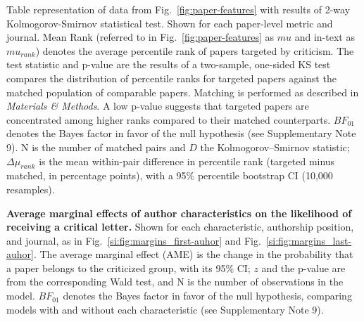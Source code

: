 \documentclass[12pt]{article} %
\def\methods{\textit{Materials \& Methods}}
\begin{document}
\clearpage
\begin{table}[p]
\scriptsize
\centering
\caption{
Table representation of data from Fig.~\ref*{fig:paper-features} with results of 2-way Kolmogorov-Smirnov statistical test. 
Shown for each paper-level metric and journal. 
Mean Rank (referred to in Fig.~\ref*{fig:paper-features} as $mu$ and in-text as $mu_{rank}$) denotes the average percentile rank of papers targeted by criticism.
The test statistic and p-value are the results of a two-sample, one-sided KS test compares the distribution of percentile ranks for targeted papers against the matched population of comparable papers. 
Matching is performed as described in \methods.
A low p-value suggests that targeted papers are concentrated among higher ranks compared to their matched counterparts.
$BF_{01}$ denotes the Bayes factor in favor of the null hypothesis (see Supplementary Note 9).
 N is the number of matched pairs and $D$ the Kolmogorov–Smirnov statistic; $\Delta\mu_{rank}$ is the mean within-pair difference in percentile rank (targeted minus matched, in percentage points), with a 95\% percentile bootstrap CI (10,000 resamples).
}
\label{si:table:paper-features-2sKS} 
%
\end{table}


\begin{table}[ht]
\footnotesize
\centering
\caption{
\textbf{Average marginal effects of author characteristics on the likelihood of receiving a critical letter.}
Shown for each characteristic, authorship position, and journal, as in Fig.~\ref{si:fig:margins_first-auhor} and Fig.~\ref{si:fig:margins_last-auhor}.
The average marginal effect (AME) is the change in the probability that a paper belongs to the criticized group, with its 95\% CI; $z$ and the p-value are from the corresponding Wald test, and N is the number of observations in the model.
$BF_{01}$ denotes the Bayes factor in favor of the null hypothesis, comparing models with and without each characteristic (see Supplementary Note 9).
}
\label{si:tab:ame}
%
\end{table}
\end{document}
